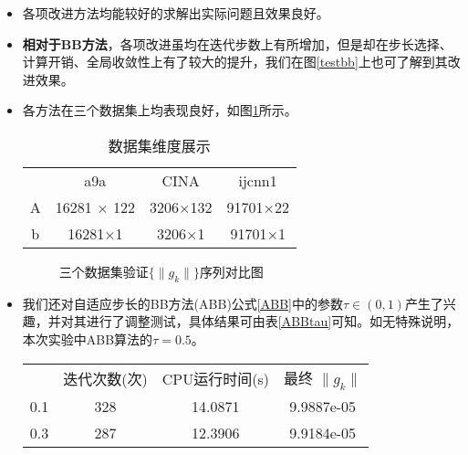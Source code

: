 \begin{itemize}
	\item 各项改进方法均能较好的求解出实际问题且效果良好。
	\item \textbf{相对于BB方法}，各项改进虽均在迭代步数上有所增加，但是却在步长选择、计算开销、全局收敛性上有了较大的提升，我们在图\ref{testbb}上也可了解到其改进效果。
	\item 各方法在三个数据集上均表现良好，如图\ref{datesetcontrast}所示。
	
	\begin{table}\centering
		\begin{tabular}{cccc}
			\toprule
			\hline
			& a9a & CINA & ijcnn1 \\
			\cmidrule(lr){2-4}
			A & 16281 $\times$ 122 & 3206$\times$132 & 91701$\times$22 \\
			
			b & 16281$\times$1 & 3206$\times$1 & 91701$\times$1 \\
			\hline
		\end{tabular}
		\caption{数据集维度展示}
		\label{dataset}
	\end{table}

\begin{figure}[htbp]
	\centering
	\quad
	\quad
	\quad
	\caption{三个数据集验证$ \{ \|  g_{k} \| \} $序列对比图}
	\label{datesetcontrast}
\end{figure}

\item 我们还对自适应步长的BB方法(ABB)公式\ref{ABB}中的参数$ \tau \in (0,1)$产生了兴趣，并对其进行了调整测试，具体结果可由表\ref{ABBtau}可知。如无特殊说明，本次实验中ABB算法的$ \tau =0.5$。

\begin{table}[thp]
	\centering
	\begin{tabular}{cccc}
		\toprule
		\hline
		& 迭代次数(次) & CPU运行时间(s) & 最终 $ \|  g_{k} \|  $ \\
		\cmidrule(lr){2-4}
		0.1 & 328 & 14.0871 & 9.9887e-05 \\
		
		0.3 & 287 &  12.3906 & 9.9184e-05 \\
		

\end{tabular}
\end{table}
\end{itemize}
